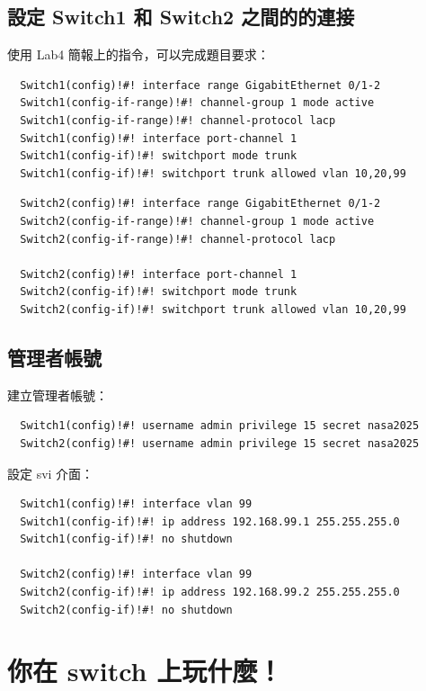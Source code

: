 \documentclass[12pt]{article}
\begin{document}
\subsection{設定 Switch1 和 Switch2 之間的的連接}
使用 Lab4 簡報上的指令，可以完成題目要求：
\begin{verbatim}
  Switch1(config)!#! interface range GigabitEthernet 0/1-2
  Switch1(config-if-range)!#! channel-group 1 mode active
  Switch1(config-if-range)!#! channel-protocol lacp
  Switch1(config)!#! interface port-channel 1
  Switch1(config-if)!#! switchport mode trunk
  Switch1(config-if)!#! switchport trunk allowed vlan 10,20,99
\end{verbatim}
\vspace{-0.5cm}
\begin{verbatim}
  Switch2(config)!#! interface range GigabitEthernet 0/1-2
  Switch2(config-if-range)!#! channel-group 1 mode active
  Switch2(config-if-range)!#! channel-protocol lacp

  Switch2(config)!#! interface port-channel 1
  Switch2(config-if)!#! switchport mode trunk
  Switch2(config-if)!#! switchport trunk allowed vlan 10,20,99
\end{verbatim}

\subsection{管理者帳號}
建立管理者帳號：
\begin{verbatim}
  Switch1(config)!#! username admin privilege 15 secret nasa2025
  Switch2(config)!#! username admin privilege 15 secret nasa2025
\end{verbatim}
設定 svi 介面：
\begin{verbatim}
  Switch1(config)!#! interface vlan 99
  Switch1(config-if)!#! ip address 192.168.99.1 255.255.255.0
  Switch1(config-if)!#! no shutdown
  
  Switch2(config)!#! interface vlan 99
  Switch2(config-if)!#! ip address 192.168.99.2 255.255.255.0
  Switch2(config-if)!#! no shutdown
\end{verbatim}
\clearpage
\section{你在 switch 上玩什麼！}
\end{document}
